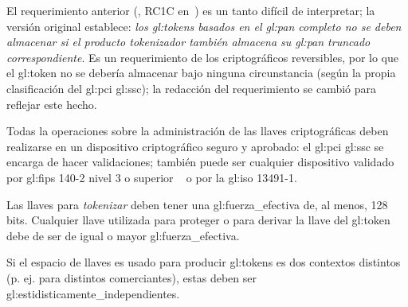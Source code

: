 El requerimiento anterior (,
RC1C en~\cite{pci_tokens}) es un tanto difícil de interpretar; la versión
original establece: \textit{los \glspl{gl:token} basados en el \gls{gl:pan}
completo no se deben almacenar si el producto tokenizador también almacena
su \gls{gl:pan} truncado correspondiente}. Es un requerimiento de los
criptográficos reversibles, por lo que el \gls{gl:token} no se debería
almacenar bajo ninguna circunstancia (según la propia clasificación del
\gls{gl:pci} \gls{gl:ssc}); la redacción del requerimiento se cambió para
reflejar este hecho.

{
  Todas la operaciones sobre la administración de las llaves criptográficas
  deben realizarse en un dispositivo criptográfico seguro y aprobado: el
  \gls{gl:pci} \gls{gl:ssc} se encarga de hacer validaciones; también puede ser
  cualquier dispositivo validado por \gls{gl:fips} 140-2 nivel 3 o superior
 ~\cite{nist_modulos_criptograficos} o por la \gls{gl:iso} 13491-1.
}

{
  Las llaves para \textit{tokenizar} deben tener una
  \gls{gl:fuerza_efectiva} de, al menos, 128 bits. Cualquier llave utilizada
  para proteger o para derivar la llave del \gls{gl:token} debe de ser de igual
  o mayor \gls{gl:fuerza_efectiva}.
}

{
  Si el espacio de llaves es usado para producir \glspl{gl:token} es dos
  contextos distintos (p. ej. para distintos comerciantes), estas deben ser
  \glspl{gl:estidisticamente_independiente}.
}
